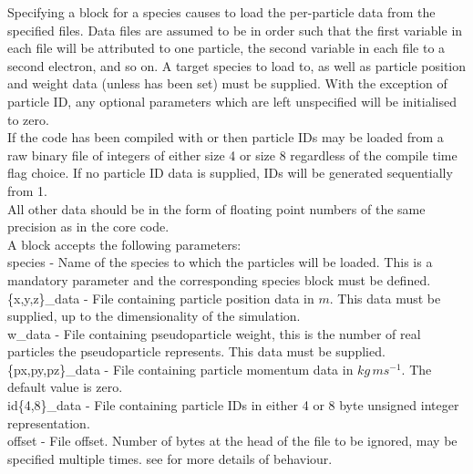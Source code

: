 Specifying a  block for a species causes {\EPOCH}
to load the per-particle data from the specified files. Data files are assumed
to be in order such that the first variable in each file will be attributed to
one particle, the second variable in each file to a second electron, and so on.
A target species to load to, as well as particle position and weight data
(unless  has been set) must be supplied.
With the exception of particle ID, any optional parameters which are left
unspecified will be initialised to zero.\\

If the code has been compiled with  or
 then particle IDs may be loaded from a raw binary
file of integers of either size 4 or size 8 regardless of the compile time flag
choice.  If no particle ID data is supplied, IDs will be generated sequentially
from 1.\\

All other data should be in the form of floating point numbers of the same
precision as  in the core {\EPOCH} code.\\

A  block accepts the following parameters:\\

{\emphtext species} - Name of the species to which the particles
will be loaded.  This is a mandatory parameter and the corresponding species
block must be defined.\\

{\emphtext \{x,y,z\}\_data} - File containing particle position data in $m$.
This data must be supplied, up to the dimensionality of the simulation.\\

{\emphtext w\_data} - File containing pseudoparticle weight, this is the number
of real particles the pseudoparticle represents. This data must be supplied.\\

{\emphtext \{px,py,pz\}\_data} - File containing particle momentum data
in $kg\,ms^{-1}$. The default value is zero.\\

{\emphtext id\{4,8\}\_data} - File containing particle IDs in either 4 or 8
byte unsigned integer representation.\\

{\emphtext offset} - File offset. Number of bytes at the head of the file to be
ignored, may be specified multiple times. see  for more
details of behaviour.\\


